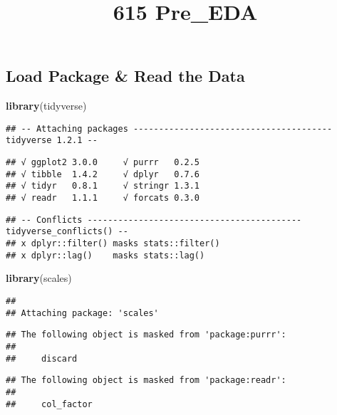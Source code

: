 \documentclass[]{article}
\title{615 Pre\_EDA}
\author{}
\date{}
\newenvironment{Shaded}{\begin{snugshade}}{\end{snugshade}}
\newcommand{\KeywordTok}[1]{\textcolor[rgb]{0.13,0.29,0.53}{\textbf{#1}}}
\newcommand{\NormalTok}[1]{#1}
\begin{document}
\maketitle

\subsection{Load Package \& Read the
Data}\label{load-package-read-the-data}

\begin{Shaded}
\begin{Highlighting}[]
\KeywordTok{library}\NormalTok{(tidyverse)}
\end{Highlighting}
\end{Shaded}

\begin{verbatim}
## -- Attaching packages --------------------------------------- tidyverse 1.2.1 --
\end{verbatim}

\begin{verbatim}
## √ ggplot2 3.0.0     √ purrr   0.2.5
## √ tibble  1.4.2     √ dplyr   0.7.6
## √ tidyr   0.8.1     √ stringr 1.3.1
## √ readr   1.1.1     √ forcats 0.3.0
\end{verbatim}

\begin{verbatim}
## -- Conflicts ------------------------------------------ tidyverse_conflicts() --
## x dplyr::filter() masks stats::filter()
## x dplyr::lag()    masks stats::lag()
\end{verbatim}

\begin{Shaded}
\begin{Highlighting}[]
\KeywordTok{library}\NormalTok{(scales) }
\end{Highlighting}
\end{Shaded}

\begin{verbatim}
## 
## Attaching package: 'scales'
\end{verbatim}

\begin{verbatim}
## The following object is masked from 'package:purrr':
## 
##     discard
\end{verbatim}

\begin{verbatim}
## The following object is masked from 'package:readr':
## 
##     col_factor
\end{verbatim}
\end{document}
